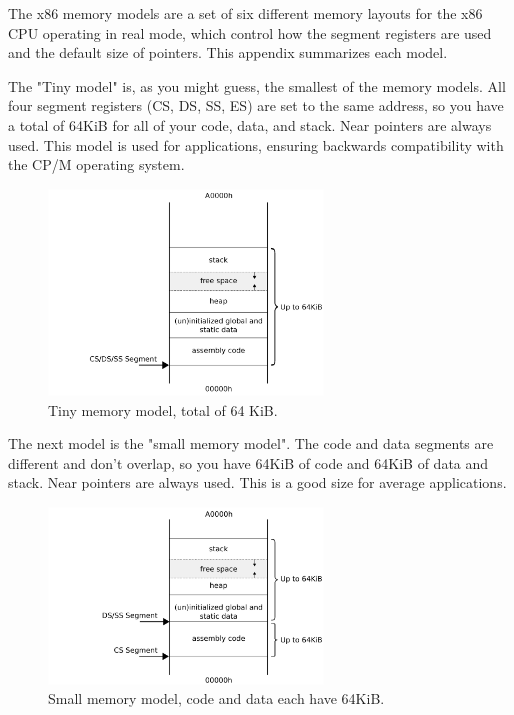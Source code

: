 
\label{appendix_memory_models}
The x86 memory models are a set of six different memory layouts for the x86 CPU operating in real mode, which control how the segment registers are used and the default size of pointers. This appendix summarizes each model.\\

\par
The "Tiny model" is, as you might guess, the smallest of the memory models. All
four segment registers (CS, DS, SS, ES) are set to the same address, so you have a total of 64KiB for all of your code, data, and stack. Near pointers are always used. This model is used for  applications, ensuring backwards compatibility with the CP/M operating system.\\
\vspace{-2pt}
\begin{figure}[H]
\centering
\includegraphics[width=0.65\textwidth]{imgs/drawings/memory/tiny_mm_v2.eps}
\caption{Tiny memory model, total of 64 KiB.}
\label{fig:mm_tiny}
\end{figure}

\pagebreak

The next model is the "small memory model". The code and data segments are different and don't overlap, so you have 64KiB of code and 64KiB of data and stack. Near pointers are
always used. This is a good size for average applications.
\vspace{-2pt}
\begin{figure}[H]
\centering
\includegraphics[width=0.65\textwidth]{imgs/drawings/memory/small_mm_v2.eps}
\caption{Small memory model, code and data each have 64KiB.}
\label{fig:mm_small}
\end{figure}

